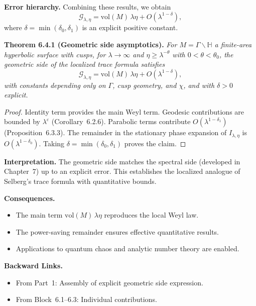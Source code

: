 \noindent\textbf{Error hierarchy.}
Combining these results, we obtain
\[
  \mathcal{G}_{\lambda,\eta}
  = \mathrm{vol}(M)\,\lambda\eta
  + O(\lambda^{1-\delta}),
\]
where $\delta = \min(\delta_0,\delta_1)$ is an explicit positive constant.

\medskip

\noindent\textbf{Theorem 6.4.1 (Geometric side asymptotics).}
\emph{For $M=\Gamma\backslash\mathbb{H}$ a finite-area hyperbolic surface with cusps,  
for $\lambda\to\infty$ and $\eta\ge \lambda^{-\theta}$ with $0<\theta<\theta_0$,  
the geometric side of the localized trace formula satisfies}
\[
  \mathcal{G}_{\lambda,\eta}
  = \mathrm{vol}(M)\,\lambda\eta
  + O(\lambda^{1-\delta}),
\]
\emph{with constants depending only on $\Gamma$, cusp geometry, and $\chi$,  
and with $\delta>0$ explicit.}

\begin{proof}
Identity term provides the main Weyl term.  
Geodesic contributions are bounded by $\lambda^\varepsilon$ (Corollary~6.2.6).  
Parabolic terms contribute $O(\lambda^{1-\delta_1})$ (Proposition~6.3.3).  
The remainder in the stationary phase expansion of $I_{\lambda,\eta}$ is $O(\lambda^{1-\delta_0})$.  
Taking $\delta=\min(\delta_0,\delta_1)$ proves the claim.
\end{proof}

\medskip

\noindent\textbf{Interpretation.}
The geometric side matches the spectral side (developed in Chapter~7) up to an explicit error.  
This establishes the localized analogue of Selberg’s trace formula with quantitative bounds.

\medskip

\noindent\textbf{Consequences.}
\begin{itemize}
  \item The main term $\mathrm{vol}(M)\,\lambda\eta$ reproduces the local Weyl law.
  \item The power-saving remainder ensures effective quantitative results.
  \item Applications to quantum chaos and analytic number theory are enabled.
\end{itemize}

\medskip

\noindent\textbf{Backward Links.}
\begin{itemize}
  \item From Part~1: Assembly of explicit geometric side expression.
  \item From Block~6.1–6.3: Individual contributions.
\end{itemize}


